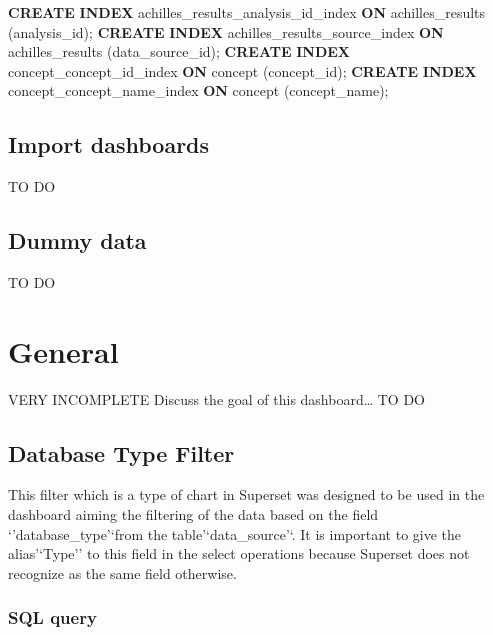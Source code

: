 \documentclass[]{book}
\newenvironment{Shaded}{\begin{snugshade}}{\end{snugshade}}
\newcommand{\KeywordTok}[1]{\textcolor[rgb]{0.13,0.29,0.53}{\textbf{#1}}}
\newcommand{\NormalTok}[1]{#1}
\begin{document}
\begin{enumerate}
\begin{Shaded}
\begin{Highlighting}[]
\KeywordTok{CREATE} \KeywordTok{INDEX}\NormalTok{ achilles_results_analysis_id_index }\KeywordTok{ON} 
\NormalTok{    achilles_results (analysis_id);}
\KeywordTok{CREATE} \KeywordTok{INDEX}\NormalTok{ achilles_results_source_index }\KeywordTok{ON}\NormalTok{ achilles_results }
\NormalTok{    (data_source_id);}
\KeywordTok{CREATE} \KeywordTok{INDEX}\NormalTok{ concept_concept_id_index }\KeywordTok{ON}\NormalTok{ concept (concept_id);}
\KeywordTok{CREATE} \KeywordTok{INDEX}\NormalTok{ concept_concept_name_index }\KeywordTok{ON}\NormalTok{ concept }
\NormalTok{    (concept_name);}
\end{Highlighting}
\end{Shaded}
\end{enumerate}

\section{Import dashboards}\label{import-dashboards}

TO DO

\section{Dummy data}\label{dummy-data}

TO DO

\chapter{General}\label{general}

VERY INCOMPLETE Discuss the goal of this dashboard\ldots{} TO DO

\section{Database Type Filter}\label{database-type-filter}

This filter which is a type of chart in Superset was designed to be used
in the dashboard aiming the filtering of the data based on the field
`'database\_type'`from the table'`data\_source'`. It is important to
give the alias'`Type'' to this field in the select operations because
Superset does not recognize as the same field otherwise.

\subsection{SQL query}\label{sql-query}
\end{document}
